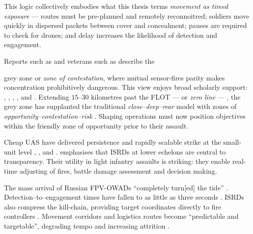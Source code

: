 This logic collectively embodies what this thesis terms \textit{movement as timed exposure} --- routes must be pre-planned and remotely reconnoitred; soldiers move quickly in dispersed packets between cover and concealment; pauses are required to check for drones; and delay increases the likelihood of detection and engagement.

 


Reports such as \textcite[22]{MOLLOY_2024} and veterans such as \textcite{dan_participant_1} describe the {grey zone or \textit{zone of contestation}, where mutual sensor-fires parity makes concentration prohibitively dangerous. This view enjoys broad scholarly support: \textcite[23]{neron_bancel_2024_05_27}, \textcite{tollast_2025_11}, \textcite[17:21--22:37]{WATLING_2023_book_launch}, \textcite[~53--58]{Watling_book}, \textcite[~2--3]{watling_2025_10} and \textcite[~53--55]{ZABRODSKYI_2022}. Extending $15$--$30$ kilometres past the FLOT --- or \textit{zero line} --- \parencite[5]{Tyshchenko_2026_03_20_ukraine_bunker_story,watling_2025_10}, the grey zone has supplanted the traditional \textit{close--deep--rear} model with zones of \textit{opportunity--contestation--risk} \parencite[~53--58]{Watling_book}. Shaping operations must now position objectives within the friendly zone of opportunity prior to their assault.


Cheap UAS have delivered persistence and rapidly scalable strike at the small-unit level \parencite[4:11--5:12]{civdiv_3}, \parencite[23]{kunertova_2024_2024_08}, \parencite[~26--28]{neron_bancel_2024_05_27} and \parencite[2]{watling_2025_10}. \textcite{tollast_2025_11} emphasises that ISRDs at lower echelons are central to transparency. Their utility in light infantry assaults is striking: they enable real-time adjusting of fires, battle damage assessment and decision making.

The mass arrival of Russian FPV-OWADs ``completely turn[ed] the tide'' \parencite{darragh_participant_4,fred_participant_9}. Detection--to--engagement times have fallen to as little as three seconds \parencite{stu_lyle_participant_11}. ISRDs also compress the kill-chain, providing target coordinates directly to fire controllers \parencite[29]{MOLLOY_2024,neron_bancel_2024_05_27}. Movement corridors and logistics routes become ``predictable and targetable'', degrading tempo and increasing attrition \parencite{WATLING_2024A}.

}
